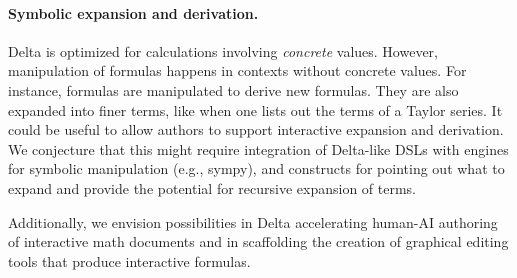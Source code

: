 \paragraph{Symbolic expansion and derivation.} Delta is optimized for calculations involving \emph{concrete} values. However, manipulation of formulas happens in contexts without concrete values. For instance, formulas are manipulated to derive new formulas. They are also expanded into finer terms, like when one lists out the terms of a Taylor series. It could be useful to allow authors to support interactive expansion and derivation. We conjecture that this might require integration of Delta-like DSLs with engines for symbolic manipulation (e.g., sympy), and constructs for pointing out what to expand and provide the potential for recursive expansion of terms.

\medskip

Additionally, we envision possibilities in Delta accelerating human-AI authoring of interactive math documents and in scaffolding the creation of graphical editing tools that produce interactive formulas.
